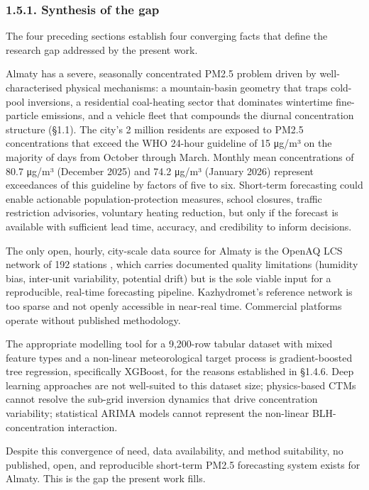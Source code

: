 \subsubsection{1.5.1. Synthesis of the gap}\label{synthesis-of-the-gap}

The four preceding sections establish four converging facts that define the research gap addressed by the present work.

Almaty has a severe, seasonally concentrated PM2.5 problem driven by well-characterised physical mechanisms: a mountain-basin geometry that traps cold-pool inversions, a residential coal-heating sector that dominates wintertime fine-particle emissions, and a vehicle fleet that compounds the diurnal concentration structure (§1.1). The city's 2 million residents are exposed to PM2.5 concentrations that exceed the WHO 24-hour guideline \cite{who_aqg_2021} of 15 μg/m³ on the majority of days from October through March. Monthly mean concentrations of 80.7 μg/m³ (December 2025) and 74.2 μg/m³ (January 2026) represent exceedances of this guideline by factors of five to six. Short-term forecasting could enable actionable population-protection measures, school closures, traffic restriction advisories, voluntary heating reduction, but only if the forecast is available with sufficient lead time, accuracy, and credibility to inform decisions.

The only open, hourly, city-scale data source for Almaty is the OpenAQ LCS network of 192 stations \cite{openaq_platform}, which carries documented quality limitations (humidity bias, inter-unit variability, potential drift) but is the sole viable input for a reproducible, real-time forecasting pipeline. Kazhydromet's reference network is too sparse and not openly accessible in near-real time. Commercial platforms operate without published methodology.

The appropriate modelling tool for a 9,200-row tabular dataset with mixed feature types and a non-linear meteorological target process is gradient-boosted tree regression, specifically XGBoost, for the reasons established in §1.4.6. Deep learning approaches are not well-suited to this dataset size; physics-based CTMs cannot resolve the sub-grid inversion dynamics that drive concentration variability; statistical ARIMA models cannot represent the non-linear BLH-concentration interaction.

Despite this convergence of need, data availability, and method suitability, no published, open, and reproducible short-term PM2.5 forecasting system exists for Almaty. This is the gap the present work fills.

